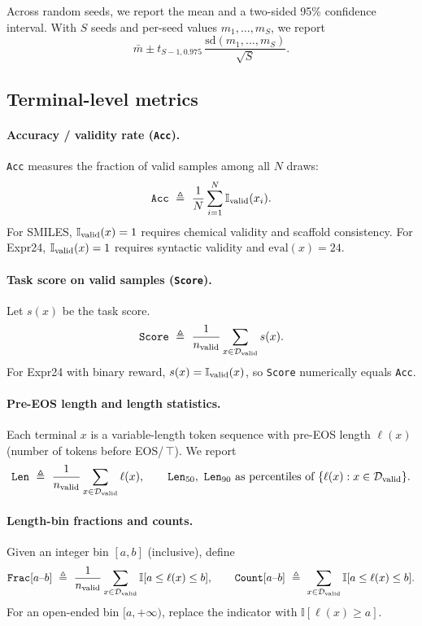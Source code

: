 \documentclass{article}
\theoremstyle{plain}
\theoremstyle{definition}
\theoremstyle{remark}
\begin{document}
Across random seeds, we report the mean and a two-sided 95\% confidence interval.
With $S$ seeds and per-seed values $m_1,\dots,m_S$, we report
\[
\bar m \pm t_{S-1,0.975}\,\frac{\mathrm{sd}(m_1,\dots,m_S)}{\sqrt{S}}.
\]


\subsection{Terminal-level metrics}
\label{app:metrics_terminal}

\paragraph{Accuracy / validity rate (\texttt{Acc}).}
\texttt{Acc} measures the fraction of valid samples among all $N$ draws:
\begin{equation}
\texttt{Acc}\ \triangleq\ \frac{1}{N}\sum_{i=1}^{N}\mathbb{I}_{\valid}(x_i).
\end{equation}
For SMILES, $\mathbb{I}_{\mathrm{valid}}(x)=1$ requires chemical validity and scaffold consistency.
For Expr24, $\mathbb{I}_{\mathrm{valid}}(x)=1$ requires syntactic validity and $\mathrm{eval}(x)=24$.

\paragraph{Task score on valid samples (\texttt{Score}).}
Let $s(x)$ be the task score.
\begin{equation}
\texttt{Score}\ \triangleq\ \frac{1}{n_{\valid}}\sum_{x\in\mathcal{D}_{\valid}} s(x).
\end{equation}
For Expr24 with binary reward, $s(x)=\mathbb{I}_{\mathrm{valid}}(x)$, so \texttt{Score} numerically equals \texttt{Acc}.

\paragraph{Pre-EOS length and length statistics.}
Each terminal $x$ is a variable-length token sequence with pre-EOS length $\ell(x)$ (number of tokens before EOS/\,$\top$).
We report
\[
\texttt{Len}\ \triangleq\ \frac{1}{n_{\valid}}\sum_{x\in\mathcal{D}_{\valid}}\ell(x),\qquad
\texttt{Len}_{50},\ \texttt{Len}_{90}\ \text{as percentiles of }\{\ell(x):x\in\mathcal{D}_{\valid}\}.
\]

\paragraph{Length-bin fractions and counts.}
Given an integer bin $[a,b]$ (inclusive), define
\[
\texttt{Frac}[a\text{--}b]\ \triangleq\ \frac{1}{n_{\valid}}\sum_{x\in\mathcal{D}_{\valid}}\mathbb{I}[a\le \ell(x)\le b],\qquad
\texttt{Count}[a\text{--}b]\ \triangleq\ \sum_{x\in\mathcal{D}_{\valid}}\mathbb{I}[a\le \ell(x)\le b].
\]
For an open-ended bin $[a,+\infty)$, replace the indicator with $\mathbb{I}[\ell(x)\ge a]$.
\end{document}
